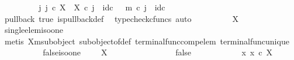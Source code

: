 \begin{isabellebody}
\ \ \ \ \ \ \isamarkupfalse%
\ \isamarkupfalse%
\ {\isachardoublequoteopen}{\isasymexists}{\isacharbang}{\kern0pt}j{\isachardot}{\kern0pt}\ j\ {\isasymin}\isactrlsub c\ X\ {\isasymand}\ {\isasymbeta}\isactrlbsub X\isactrlesub \ {\isasymcirc}\isactrlsub c\ j\ {\isacharequal}{\kern0pt}\ id\isactrlsub c\ {\isasymone}\ {\isasymand}\ m\ {\isasymcirc}\isactrlsub c\ j\ {\isacharequal}{\kern0pt}\ id\isactrlsub c\ {\isasymone}{\isachardoublequoteclose}\isanewline
\ \ \ \ \ \ \ \ \isamarkupfalse%
\ {\isasymchi}{\isacharunderscore}{\kern0pt}pullback\ {\isasymchi}{\isacharunderscore}{\kern0pt}true\ is{\isacharunderscore}{\kern0pt}pullback{\isacharunderscore}{\kern0pt}def\ \isamarkupfalse%
\ {\isacharparenleft}{\kern0pt}typecheck{\isacharunderscore}{\kern0pt}cfuncs{\isacharcomma}{\kern0pt}\ auto{\isacharparenright}{\kern0pt}\isanewline
\ \ \ \ \ \ \isamarkupfalse%
\ \isamarkupfalse%
\ {\isachardoublequoteopen}X\ {\isasymcong}\ {\isasymone}{\isachardoublequoteclose}\isanewline
\ \ \ \ \ \ \ \ \isamarkupfalse%
\ single{\isacharunderscore}{\kern0pt}elem{\isacharunderscore}{\kern0pt}iso{\isacharunderscore}{\kern0pt}one\isanewline
\ \ \ \ \ \ \ \ \isamarkupfalse%
\ {\isacharparenleft}{\kern0pt}metis\ X{\isacharunderscore}{\kern0pt}m{\isacharunderscore}{\kern0pt}subobject\ subobject{\isacharunderscore}{\kern0pt}of{\isacharunderscore}{\kern0pt}def{}\ terminal{\isacharunderscore}{\kern0pt}func{\isacharunderscore}{\kern0pt}comp{\isacharunderscore}{\kern0pt}elem\ terminal{\isacharunderscore}{\kern0pt}func{\isacharunderscore}{\kern0pt}unique{\isacharparenright}{\kern0pt}\ \isanewline
\ \ \ \ \isamarkupfalse%
\isanewline
\isanewline
\ \ \ \ \isamarkupfalse%
\ false{\isacharunderscore}{\kern0pt}iso{\isacharunderscore}{\kern0pt}one{\isacharcolon}{\kern0pt}\ {\isachardoublequoteopen}{\isasymchi}\ {\isacharequal}{\kern0pt}\ {\isasymf}\ {\isasymLongrightarrow}\ X\ {\isasymcong}\ {\isasymemptyset}{\isachardoublequoteclose}\isanewline
\ \ \ \ \isamarkupfalse%
\ {\isacharminus}{\kern0pt}\isanewline
\ \ \ \ \ \ \isamarkupfalse%
\ {\isasymchi}{\isacharunderscore}{\kern0pt}false{\isacharcolon}{\kern0pt}\ {\isachardoublequoteopen}{\isasymchi}\ {\isacharequal}{\kern0pt}\ {\isasymf}{\isachardoublequoteclose}\isanewline
\ \ \ \ \ \ \isamarkupfalse%
\ {\isachardoublequoteopen}{\isasymnexists}\ x{\isachardot}{\kern0pt}\ x\ {\isasymin}\isactrlsub c\ X{\isachardoublequoteclose}\isanewline

\end{isabellebody}

